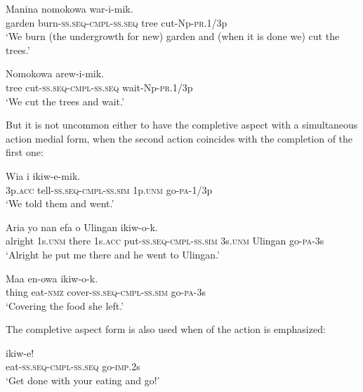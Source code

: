 \ea%
\label{ex:x1041}
\gll Manina  nomokowa war-i-mik. \\
garden burn-\textsc{ss}.\textsc{seq}-\textsc{cmpl}-\textsc{ss}.\textsc{seq} tree cut-Np-\textsc{pr}.1/3p\\
\glt`We burn (the undergrowth for new) garden and (when it is done we) cut the trees.'
\z

\ea%
\label{ex:x1042}
\gll Nomokowa  arew-i-mik. \\
tree cut-\textsc{ss}.\textsc{seq}-\textsc{cmpl}-\textsc{ss}.\textsc{seq} wait-Np-\textsc{pr}.1/3p\\
\glt`We cut the trees and wait.'
\z

But it is not uncommon either to have the completive aspect with a simultaneous action medial form, when the second action coincides with the completion of the first one:

\ea%
\label{ex:x363}
\gll Wia  i ikiw-e-mik. \\
3p.\textsc{acc} tell-\textsc{ss}.\textsc{seq}-\textsc{cmpl}-\textsc{ss}.\textsc{sim} 1p.\textsc{unm} go-\textsc{pa}-1/3p\\
\glt`We told them and went.' 
\z

\ea%
\label{ex:x1040}
\gll Aria yo nan efa  o Ulingan ikiw-o-k.\\
alright 1s.\textsc{unm} there 1s.\textsc{acc} put-\textsc{ss}.\textsc{seq}-\textsc{cmpl}-\textsc{ss}.\textsc{sim} 3s.\textsc{unm} Ulingan go-\textsc{pa}-3s\\
\glt`Alright he put me there and he went to Ulingan.'
\z

\ea%
\label{ex:x1043}
\gll Maa en-owa  ikiw-o-k. \\
thing eat-\textsc{nmz} cover-\textsc{ss}.\textsc{seq}-\textsc{cmpl}-\textsc{ss}.\textsc{sim} go-\textsc{pa}-3s\\
\glt`Covering the food she left.'
\z

The completive aspect form is also used when  of the action is emphasized:

\ea%
\label{ex:x364}
\gll {} ikiw-e! \\
eat-\textsc{ss}.\textsc{seq}-\textsc{cmpl}-\textsc{ss}.\textsc{seq} go-\textsc{imp}.2s\\
\glt`Get done with your eating and go!'
\z

